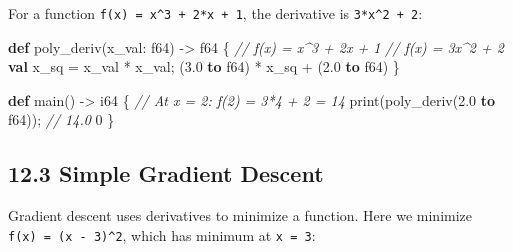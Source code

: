 \documentclass[
  english,
]{book}
\newenvironment{Shaded}{\begin{snugshade}}{\end{snugshade}}
\newcommand{\CommentTok}[1]{\textcolor[rgb]{0.42,0.60,0.33}{\textit{#1}}}
\newcommand{\DataTypeTok}[1]{\textcolor[rgb]{0.31,0.79,0.69}{#1}}
\newcommand{\DecValTok}[1]{\textcolor[rgb]{0.71,0.81,0.66}{#1}}
\newcommand{\FloatTok}[1]{\textcolor[rgb]{0.71,0.81,0.66}{#1}}
\newcommand{\FunctionTok}[1]{\textcolor[rgb]{0.86,0.86,0.67}{#1}}
\newcommand{\KeywordTok}[1]{\textcolor[rgb]{0.34,0.61,0.84}{\textbf{#1}}}
\newcommand{\NormalTok}[1]{\textcolor[rgb]{0.83,0.83,0.83}{#1}}
\newcommand{\OperatorTok}[1]{\textcolor[rgb]{0.83,0.83,0.83}{#1}}
\begin{document}
For a function \texttt{f(x)\ =\ x\^{}3\ +\ 2*x\ +\ 1}, the derivative is
\texttt{3*x\^{}2\ +\ 2}:

\begin{Shaded}
\begin{Highlighting}[]
\KeywordTok{def}\NormalTok{ poly\_deriv(x\_val: }\DataTypeTok{f64}\NormalTok{) }\OperatorTok{{-}\textgreater{}} \DataTypeTok{f64}\NormalTok{ \{}
    \CommentTok{// f(x) = x\^{}3 + 2x + 1}
    \CommentTok{// f\textquotesingle{}(x) = 3x\^{}2 + 2}
    \KeywordTok{val}\NormalTok{ x\_sq }\OperatorTok{=}\NormalTok{ x\_val }\OperatorTok{*}\NormalTok{ x\_val;}
\NormalTok{    (}\FloatTok{3.0} \KeywordTok{to} \DataTypeTok{f64}\NormalTok{) }\OperatorTok{*}\NormalTok{ x\_sq }\OperatorTok{+}\NormalTok{ (}\FloatTok{2.0} \KeywordTok{to} \DataTypeTok{f64}\NormalTok{)}
\NormalTok{\}}

\KeywordTok{def}\NormalTok{ main() }\OperatorTok{{-}\textgreater{}} \DataTypeTok{i64}\NormalTok{ \{}
    \CommentTok{// At x = 2: f\textquotesingle{}(2) = 3*4 + 2 = 14}
    \FunctionTok{print}\NormalTok{(poly\_deriv(}\FloatTok{2.0} \KeywordTok{to} \DataTypeTok{f64}\NormalTok{));   }\CommentTok{// 14.0}
    \DecValTok{0}
\NormalTok{\}}
\end{Highlighting}
\end{Shaded}

\subsection{12.3 Simple Gradient Descent}\label{simple-gradient-descent}

Gradient descent uses derivatives to minimize a function. Here we
minimize \texttt{f(x)\ =\ (x\ -\ 3)\^{}2}, which has minimum at
\texttt{x\ =\ 3}:
\end{document}
